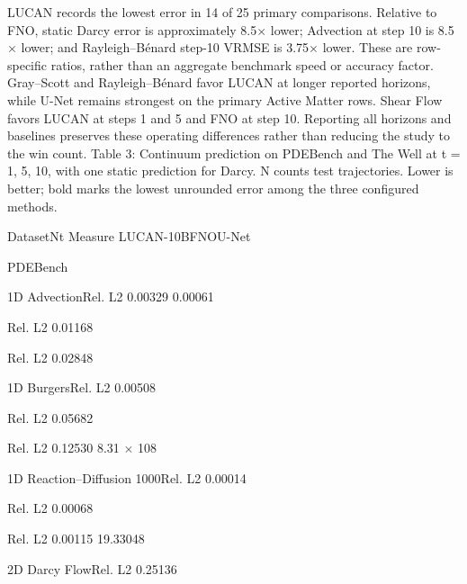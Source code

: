 \documentclass[11pt]{article}
\begin{document}
LUCAN records the lowest error in 14 of 25 primary comparisons. Relative to FNO,
static Darcy error is approximately 8.5\ensuremath{\times} lower; Advection at step 10 is 8.5\ensuremath{\times} lower; and
Rayleigh–Bénard step-10 VRMSE is 3.75\ensuremath{\times} lower. These are row-specific ratios, rather than
an aggregate benchmark speed or accuracy factor.
Gray–Scott and Rayleigh–Bénard favor LUCAN at longer reported horizons, while U-Net
remains strongest on the primary Active Matter rows. Shear Flow favors LUCAN at steps
1 and 5 and FNO at step 10. Reporting all horizons and baselines preserves these operating
differences rather than reducing the study to the win count.
Table 3: Continuum prediction on PDEBench and The Well at t = 1, 5, 10, with one static
prediction for Darcy. N counts test trajectories. Lower is better; bold marks the lowest unrounded
error among the three configured methods.


\noindent Dataset\quad N\quad t Measure LUCAN-10B\quad FNO\quad U-Net\par

PDEBench

\noindent 1D Advection\quad Rel. L2 0.00329  0.00061\par


\quad Rel. L2 0.01168\par


\quad Rel. L2 0.02848\par


\noindent 1D Burgers\quad Rel. L2 0.00508\par


\quad Rel. L2 0.05682\par


\quad Rel. L2 0.12530 8.31 \ensuremath{\times} 108\par


\noindent 1D Reaction–Diffusion 1000\quad Rel. L2 0.00014\par


\quad Rel. L2 0.00068\par


\quad Rel. L2 0.00115  19.33048\par


\noindent 2D Darcy Flow\quad Rel. L2 0.25136\par
\end{document}
